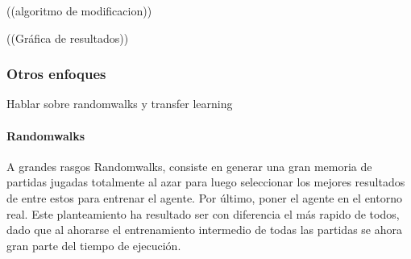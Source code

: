 ((algoritmo de modificacion))

((Gráfica de resultados))

\subsubsection*{Otros enfoques}
Hablar sobre randomwalks y transfer learning

\paragraph{Randomwalks}
A grandes rasgos Randomwalks, consiste en generar una gran memoria de partidas jugadas totalmente al azar para luego seleccionar los mejores resultados de entre estos para entrenar el agente. Por último, poner el agente en el entorno real.
Este planteamiento ha resultado ser con diferencia el más rapido de todos, dado que al ahorarse el entrenamiento intermedio de todas las partidas se ahora gran parte del tiempo de ejecución.

